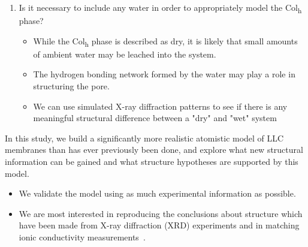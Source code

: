 \documentclass{article}
\begin{document}
\begin{enumerate}
  \item Is it necessary to include any water in order to appropriately model the 
  Col\textsubscript{h} phase? \label{point:water}
  \begin{itemize}
	\item While the Col\textsubscript{h} phase is described as dry, it is 
	likely that small amounts of ambient water may be leached into the system.
	\item The hydrogen bonding network formed by the water may play a role 
        in structuring the pore.
	\item We can use simulated X-ray diffraction patterns to see if there is
        any meaningful structural difference between a "dry" and "wet" system
  \end{itemize}
  \end{enumerate}
  
 
  In this study, we build a significantly more realistic atomistic model of LLC membranes
  than has ever previously been done, and explore what new structural information can be gained
  and what structure hypotheses are supported by this model.

  \begin{itemize}
    \item We validate the model using as much experimental information as possible.
    \item We are most interested in reproducing the conclusions about structure
    which have been made from X-ray diffraction (XRD) experiments and in matching ionic
    conductivity measurements~\cite{feng_thin_2016}.
  \end{itemize}
\end{document}
